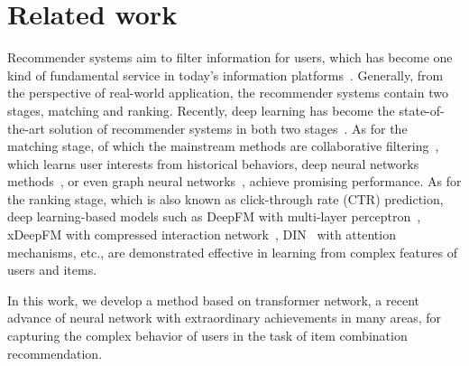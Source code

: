 \section{Related work} \label{sec:relatedwork}
Recommender systems aim to filter information for users, which has become one kind of fundamental service in today's information platforms~\cite{resnick1997recommender}.
Generally, from the perspective of real-world application, the recommender systems contain two stages, matching and ranking. 
Recently, deep learning has become the state-of-the-art solution of recommender systems in both two stages~\cite{dlrs,wu2021survey,gao2021graph}.
As for the matching stage, of which the mainstream methods are collaborative filtering~\cite{su2009survey}, which learns user interests from historical behaviors, deep neural networks methods~\cite{he2017neural}, or even graph neural networks~\cite{he2020lightgcn,wang2020disentangled}, achieve promising performance.
As for the ranking stage, which is also known as click-through rate (CTR) prediction, deep learning-based models such as DeepFM with multi-layer perceptron~\cite{deepfm}, xDeepFM with compressed interaction network~\cite{lian2018xdeepfm}, DIN~\cite{din} with attention mechanisms, etc., are demonstrated effective in learning from complex features of users and items.

In this work, we develop a method based on transformer network, a recent advance of neural network with extraordinary achievements in many areas, for capturing the complex behavior of users in the task of item combination recommendation. 


